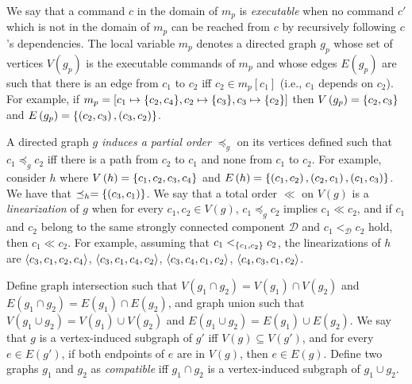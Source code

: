 We say that a command $c$ in the domain of $m_p$ is \emph{executable} when no command $c'$ which is not in the domain of $m_p$ can be reached from $c$ by recursively following $c$'s dependencies.
The local variable $m_p$ denotes a directed graph $g_p$ whose set of vertices $V\left( g_p \right)$ is the executable commands of $m_p$ and whose edges $E\left( g_p \right)$ are such that there is an edge from $c_1$ to $c_2$ iff $c_2 \in m_p\left[ c_1 \right]$ (i.e., $c_1$ depends on $c_2$). For example, if $m_p = \left[ c_1 \mapsto \aset{c_2,c_4}, c_2 \mapsto \aset{c_3}, c_3 \mapsto \aset{c_2}\right]$ then $V\left( g_p \right) = \left\{c_2,c_3\right\}$ and $E\left( g_p \right) = \left\{\left( c_2,c_3 \right),\left( c_3,c_2 \right)\right\}$.

A directed graph $g$ \emph{induces a partial order} $\preceq_g$ on its vertices defined such that $c_1 \preceq_g c_2$ iff there is a path from $c_2$ to $c_1$ and none from $c_1$ to $c_2$.
For example, consider $h$ where $V\left( h \right)=\left\{c_1,c_2,c_3,c_4\right\}$ and $E\left( h \right)=\left\{\left( c_1,c_2 \right),\left( c_2,c_1 \right),\left( c_1,c_3 \right)\right\}$. 
We have that $\preceq_h = \left\{\left( c_3,c_1 \right)\right\}$.
We say that a total order $\ll$ on $V\left( g \right)$ is a \emph{linearization} of $g$ when for every $c_1,c_2\in V\left( g \right)$, $c_1 \preceq_g c_2$ implies $c_1 \ll c_2$, and if $c_1$ and $c_2$ belong to the same strongly connected component $\mathcal{D}$ and $ c_1 <_{\mathcal{D}} c_2$ hold, then $c_1 \ll c_2$. For example, assuming that $c_1 <_{\left\{c_1,c_2\right\}} c_2$, the linearizations of $h$ are $\left\langle c_3,c_1,c_2,c_4\right\rangle$, $\left\langle c_3,c_1,c_4,c_2\right\rangle$, $\left\langle c_3,c_4,c_1,c_2\right\rangle$,
$\left\langle c_4,c_3,c_1,c_2\right\rangle$.

\begin{comment}
We now define a partial order on graphs. If $g_1$ and $g_2$ are two graphs, then we write $g_1 \leq g_2$ iff $V\left( g_1 \right)\subseteq V\left( g_2 \right)$, and if $v\in V\left( g_1 \right)$, $e\in E\left( g_2 \right)$, and $v$ is an endpoint of $e$, then $e\in E\left( g_1 \right)$. 
For example, consider the graphs $h'$ and $h''$ such that $V\left( h' \right)=\aset{c_1,c_2,c_4}$, $E\left( h' \right)=\aset{\left( c_1,c_2 \right),\left( c_2,c_1 \right)}$, $V\left( h'' \right)=\aset{c_1,c_3,c_4}$, and $E\left( h'' \right)=\aset{\left( c_1,c_3 \right)}$. We have that $h'\leq h$, but $ h''\not\leq h$.
\end{comment}

Define graph intersection such that $V\left( g_1 \cap g_2 \right)=V\left( g_1 \right)\cap V\left( g_2 \right)$ and $E\left( g_1 \cap g_2 \right)= E\left( g_1 \right)\cap E\left( g_2 \right)$, and graph union such that $V\left( g_1 \cup g_2 \right)=V\left( g_1 \right)\cup V\left( g_2 \right)$ and $E\left( g_1 \cup g_2 \right)= E\left( g_1 \right)\cup E\left( g_2 \right)$.
We say that $g$ is a vertex-induced subgraph of $g'$ iff $V\left( g \right)\subseteq V\left( g' \right)$, and for every $e\in E\left( g' \right)$, if both endpoints of $e$ are in $V\left( g \right)$, then $e\in E\left( g \right)$.
Define two graphs $g_1$ and $g_2$ as \emph{compatible} iff $g_1 \cap g_2$ is a vertex-induced subgraph of $g_1 \cup g_2$.

